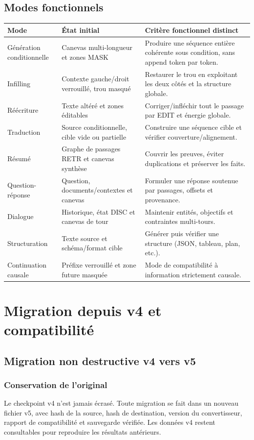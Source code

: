 \documentclass[11pt,a4paper,oneside]{report}
\begin{document}
\chapter{Modes fonctionnels}
\begin{longtable}{p{2.7cm}p{5.0cm}p{6.0cm}}
\toprule Mode & État initial & Critère fonctionnel distinct\\
\midrule Génération conditionnelle & Canevas multi-longueur et zones MASK & Produire une séquence entière cohérente sous condition, sans append token par token.\\
Infilling & Contexte gauche/droit verrouillé, trou masqué & Restaurer le trou en exploitant les deux côtés et la structure globale.\\
Réécriture & Texte altéré et zones éditables & Corriger/infléchir tout le passage par EDIT et énergie globale.\\
Traduction & Source conditionnelle, cible vide ou partielle & Construire une séquence cible et vérifier couverture/alignement.\\
Résumé & Graphe de passages RETR et canevas synthèse & Couvrir les preuves, éviter duplications et préserver les faits.\\
Question-réponse & Question, documents/contextes et canevas & Formuler une réponse soutenue par passages, offsets et provenance.\\
Dialogue & Historique, état DISC et canevas de tour & Maintenir entités, objectifs et contraintes multi-tours.\\
Structuration & Texte source et schéma/format cible & Générer puis vérifier une structure (JSON, tableau, plan, etc.).\\
Continuation causale & Préfixe verrouillé et zone future masquée & Mode de compatibilité à information strictement causale.\\
\bottomrule
\end{longtable}

\part{Migration depuis v4 et compatibilité}
\chapter{Migration non destructive v4 vers v5}
\section{Conservation de l'original}
Le checkpoint v4 n'est jamais écrasé. Toute migration se fait dans un nouveau fichier v5, avec hash de la source, hash de destination, version du convertisseur, rapport de compatibilité et sauvegarde vérifiée. Les données v4 restent consultables pour reproduire les résultats antérieurs.
\end{document}
